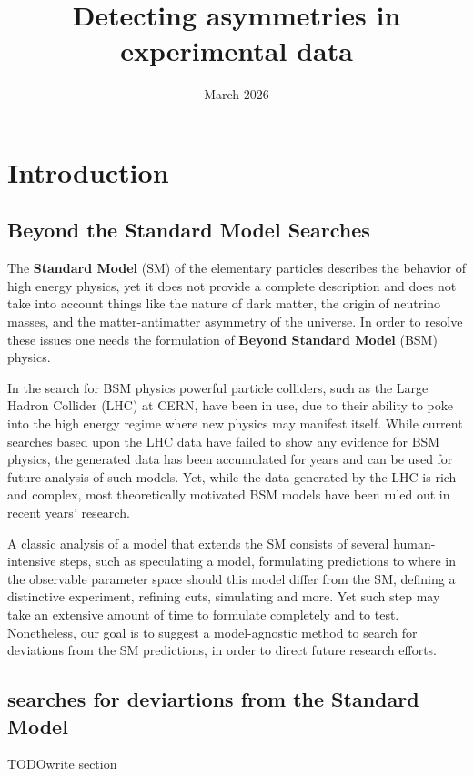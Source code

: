 \documentclass{article}
\title{Detecting asymmetries in experimental data}
\author{ }
\date{March 2026}
\begin{document}
\maketitle

  \tableofcontents


\section{Introduction}

\subsection{Beyond the Standard Model Searches}

The \textbf{Standard Model} (SM) of the elementary particles describes the behavior of high energy physics, yet it does not provide a complete description and does not take into account things like the nature of dark matter, the origin of neutrino masses, and the matter-antimatter asymmetry of the universe. In order to resolve these issues one needs the formulation of \textbf{Beyond Standard Model} (BSM) physics.

In the search for BSM physics powerful particle colliders, such as the Large Hadron Collider (LHC) at CERN, have been in use, due to their ability to poke into the high energy regime where new physics may manifest itself. While current searches based upon the LHC data have failed to show any evidence for BSM physics, the generated data has been accumulated for years and can be used for future analysis of such models. Yet, while the data generated by the LHC is rich and complex, most theoretically motivated BSM models have been ruled out in recent years' research. 

A classic analysis of a model that extends the SM consists of several human-intensive steps, such as speculating a model, formulating predictions to where in the observable parameter space should this model differ from the SM, defining a distinctive experiment, refining cuts, simulating and more. Yet such step may take an extensive amount of time to formulate completely and to test. Nonetheless, our goal is to  suggest a model-agnostic method to search for deviations from the SM predictions, in order to direct future research efforts.




\subsection{searches for deviartions from the Standard Model}
TODO{write section}
\end{document}
